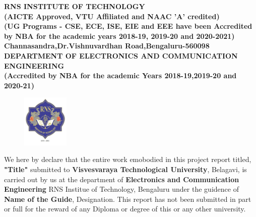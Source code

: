 
\setlength{\toptafiddle}{1in}
\setlength{\bottafiddle}{1in}
\vspace*{-0.5in}
\enlargethispage{\bottafiddle}
\thispagestyle{empty}


\begin{center}
\small\textbf{	RNS INSTITUTE OF TECHNOLOGY\\
(AICTE Approved, VTU Affiliated and NAAC 'A' credited)\\
(UG Programs - CSE, ECE, ISE, EIE and EEE have been Accredited by NBA for the academic years 2018-19, 2019-20 and 2020-2021)\\
Channasandra,Dr.Vishnuvardhan Road,Bengaluru-560098}\\
\vspace{0.3cm}
\scriptsize\textbf{DEPARTMENT OF ELECTRONICS AND COMMUNICATION ENGINEERING}\\
\small\textbf{(Accredited by NBA for the academic Years 2018-19,2019-20 and 2020-21)
}
\end{center}

\begin{center}
\begin{figure}[h]
\centering
\includegraphics[height=2.5cm]{images/rns1.jpg}
\end{figure}
\Large{\textbf{\color{red}{DECLARATION}}}
\end{center}

We here by declare that the entire work emobodied in this project report titled, \textbf{\color{red}"Title"} submitted to \textbf{\color{red}Visvesvaraya Technological University}, Belagavi, is carried out by us at the department of \textbf{\color{blue}Electronics and Communication Engineering} RNS Institue of Technology, Bengaluru under the guidence of \textbf{\color{blue}Name of the Guide}, Designation. This report has not been submitted in part or full for the reward of any Diploma or degree of this or any other university.


